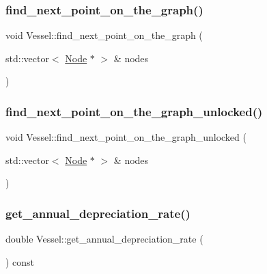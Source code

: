 \subsubsection{\texorpdfstring{find\_next\_point\_on\_the\_graph()}{find\_next\_point\_on\_the\_graph()}}
{\footnotesize\ttfamily void Vessel\+::find\+\_\+next\+\_\+point\+\_\+on\+\_\+the\+\_\+graph (\begin{DoxyParamCaption}\item[{std\+::vector$<$ \mbox{\hyperlink{class_node}{Node}} $\ast$ $>$ \&}]{nodes }\end{DoxyParamCaption})}

\mbox{\label{class_vessel_ac236e73b62ec8344b69553ee4124e440}} 
\subsubsection{\texorpdfstring{find\_next\_point\_on\_the\_graph\_unlocked()}{find\_next\_point\_on\_the\_graph\_unlocked()}}
{\footnotesize\ttfamily void Vessel\+::find\+\_\+next\+\_\+point\+\_\+on\+\_\+the\+\_\+graph\+\_\+unlocked (\begin{DoxyParamCaption}\item[{std\+::vector$<$ \mbox{\hyperlink{class_node}{Node}} $\ast$ $>$ \&}]{nodes }\end{DoxyParamCaption})\hspace{0.3cm}{\ttfamily [protected]}}

\mbox{\label{class_vessel_afcfd8fcdb5affcaece2ec8db6a598cba}} 
\subsubsection{\texorpdfstring{get\_annual\_depreciation\_rate()}{get\_annual\_depreciation\_rate()}}
{\footnotesize\ttfamily double Vessel\+::get\+\_\+annual\+\_\+depreciation\+\_\+rate (\begin{DoxyParamCaption}{ }\end{DoxyParamCaption}) const}

\mbox{\label{class_vessel_a41486bbb073b98320929cced915056db}} 
